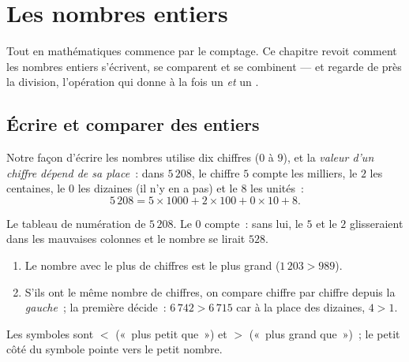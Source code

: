 \chapter{Les nombres entiers}\label{ch:g6:wholes}

Tout en mathématiques commence par le comptage. Ce chapitre revoit
comment les nombres entiers s'écrivent, se comparent et se combinent ---
et regarde de près la division, l'opération qui donne à la fois un
 \emph{et} un .

\section{Écrire et comparer des entiers}

\begin{definition}\label{def:g6:wholes:place}
Notre façon d'écrire les nombres utilise dix chiffres ($0$ à $9$), et
la \emph{valeur d'un chiffre dépend de sa place}~: dans $5\,208$, le chiffre $5$ compte les milliers, le $2$
les centaines, le $0$ les dizaines (il n'y en a pas) et le $8$ les
unités~:
\[
5\,208 = 5 \times 1000 + 2 \times 100 + 0 \times 10 + 8 .
\]
\end{definition}

\begin{omfigure}

{\small Le tableau de numération de $5\,208$. Le $0$ compte~: sans
lui, le $5$ et le $2$ glisseraient dans les mauvaises colonnes et le
nombre se lirait $528$.}
\end{omfigure}

\begin{method}\label{met:g6:wholes:compare}
\begin{enumerate}
  \item Le nombre avec le plus de chiffres est le plus grand
        ($1\,203 > 989$).
  \item S'ils ont le même nombre de chiffres, on compare chiffre par
        chiffre depuis la \emph{gauche}~; la première 
        décide~: $6\,742 > 6\,715$ car à la place des dizaines,
        $4 > 1$.
\end{enumerate}
Les symboles sont $<$ («~plus petit que~») et $>$ («~plus grand
que~»)~; le petit côté du symbole pointe vers le petit nombre.
\end{method}

